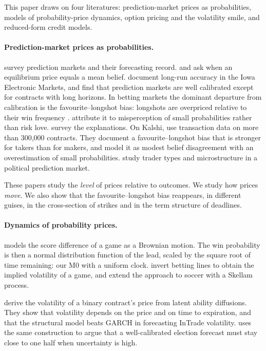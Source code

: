 This paper draws on four literatures: prediction-market prices as probabilities, models of
probability-price dynamics, option pricing and the volatility smile, and reduced-form credit
models.

\paragraph{Prediction-market prices as probabilities.} \citet{wolferszitzewitz2004} survey prediction
markets and their forecasting record. \citet{manski2006} and \citet{wolferszitzewitz2006} ask when
an equilibrium price equals a mean belief. \citet{berg2008} document long-run accuracy in the Iowa
Electronic Markets, and \citet{pageclemen2013} find that prediction markets are well calibrated
except for contracts with long horizons. In betting markets the dominant departure from
calibration is the favourite--longshot bias: longshots are overpriced relative to their win
frequency \citep{griffith1949,thalerziemba1988}. \citet{snowbergwolfers2010} attribute it to
misperception of small probabilities rather than risk love. \citet{ottaviani2008} survey the
explanations. On Kalshi, \citet{burgi2025} use transaction data on more than 300,000 contracts.
They document a favourite--longshot bias that is stronger for takers than for makers, and model it
as modest belief disagreement with an overestimation of small probabilities.
\citet{rothschildsethi2016} study trader types and microstructure in a political prediction market.

These papers study the \emph{level} of prices relative to outcomes. We study how prices
\emph{move}. We also show that the favourite--longshot bias reappears, in different guises, in the
cross-section of strikes and in the term structure of deadlines.

\paragraph{Dynamics of probability prices.} \citet{stern1994} models the score difference of a game
as a Brownian motion. The win probability is then a normal distribution function of the lead,
scaled by the square root of time remaining: our M0 with a uniform clock.
\citet{polsonstern2015} invert betting lines to obtain the implied volatility of a game, and
\citet{fengpolsonxu2016} extend the approach to soccer with a Skellam process.

\citet{archakipeirotis2009} derive the volatility of a binary contract's price from latent ability
diffusions. They show that volatility depends on the price and on time to expiration, and that the
structural model beats GARCH in forecasting InTrade volatility. \citet{taleb2018} uses the same
construction to argue that a well-calibrated election forecast must stay close to one half when
uncertainty is high.

